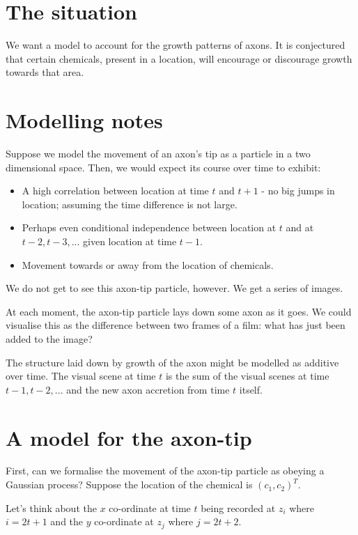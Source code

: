 \documentclass{article}
\begin{document}
\section{The situation}

We want a model to account for the growth patterns of axons. It is conjectured that certain chemicals, present in a location, will encourage or discourage growth towards that area.

\section{Modelling notes}

Suppose we model the movement of an axon's tip as a particle in a two dimensional space. Then, we would expect its course over time to exhibit:

\begin{itemize}
 \item A high correlation between location at time $t$ and $t+1$ - no big jumps in location; assuming the time difference is not large.
 \item Perhaps even conditional independence between location at $t$ and at $t-2, t-3, ...$ given location at time $t-1$.
 \item Movement towards or away from the location of chemicals.
\end{itemize}

We do not get to see this axon-tip particle, however. We get a series of images. 

At each moment, the axon-tip particle lays down some axon as it goes. We could visualise this as the difference between two frames of a film: what has just been added to the image?

The structure laid down by growth of the axon might be modelled as additive over time. The visual scene at time $t$ is the sum of the visual scenes at time $t-1, t-2,...$ and the new axon accretion from time $t$ itself.

\section{A model for the axon-tip}

First, can we formalise the movement of the axon-tip particle as obeying a Gaussian process? Suppose the location of the chemical is $(c_1,c_2)^T$. 

Let's think about the $x$ co-ordinate at time $t$ being recorded at $z_i$ where $i=2t+1$ and the $y$ co-ordinate at $z_j$ where $j=2t+2$.
\end{document}
